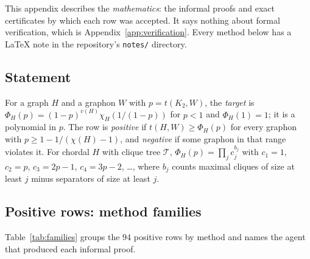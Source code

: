 \documentclass[11pt,a4paper]{article}
\newcommand{\ttt}[1]{\texttt{#1}}
\begin{document}
This appendix describes the \emph{mathematics}: the informal proofs and exact certificates by which each row
was accepted. It says nothing about formal verification, which is Appendix~\ref{app:verification}. Every
method below has a LaTeX note in the repository's \ttt{notes/} directory.

\subsection{Statement}

For a graph $H$ and a graphon $W$ with $p=t(K_2,W)$, the \emph{target} is $\Phi_H(p)=(1-p)^{v(H)}\chi_H(1/(1-p))$
for $p<1$ and $\Phi_H(1)=1$; it is a polynomial in $p$. The row is \emph{positive} if $t(H,W)\ge\Phi_H(p)$ for
every graphon with $p\ge1-1/(\chi(H)-1)$, and \emph{negative} if some graphon in that range violates it. For
chordal $H$ with clique tree $\mathcal T$, $\Phi_H(p)=\prod_j c_j^{b_j}$ with $c_1=1$, $c_2=p$, $c_3=2p-1$,
$c_4=3p-2$, \dots, where $b_j$ counts maximal cliques of size at least $j$ minus separators of size at least
$j$.

\subsection{Positive rows: method families}

Table~\ref{tab:families} groups the 94 positive rows by method and names the agent that produced each informal
proof.
\end{document}
